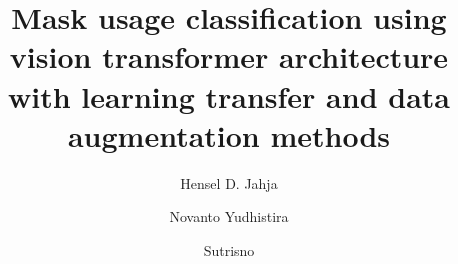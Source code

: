 \documentclass[times,onecolumn,final,longtitle]{elsarticle}
\begin{document}

\begin{frontmatter}

  \title{Mask usage classification using vision transformer
    architecture with learning transfer and data augmentation methods}%

  \author{Hensel D. Jahja}
  \author{Novanto Yudhistira}
  \author{Sutrisno}

  \address{Faculty of Computer Science, Jalan Veteran, Malang 65145, Indonesia}



\end{frontmatter}
\end{document}
